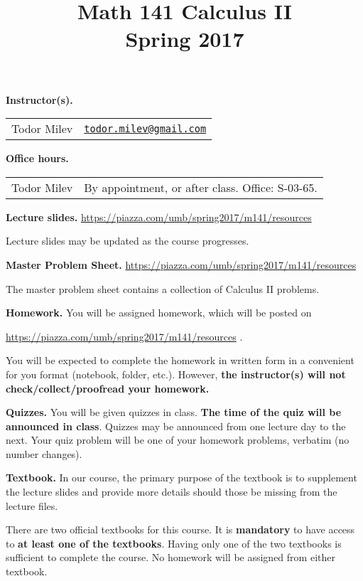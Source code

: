 \documentclass{article}
\title{Math 141 Calculus II \\ Spring 2017}
\date{}
\newcommand{\websitebase}{https://piazza.com/umb/spring2017/m141}
\begin{document}
\maketitle

\noindent \textbf{Instructor(s).} 
\begin{tabular}{ll}
Todor Milev & \href{mailto:todor.milev@gmail.com}{\nolinkurl{todor.milev@gmail.com}} 
\end{tabular}

\medskip
\noindent \textbf{Office hours. } \begin{tabular}{lp{12cm}}
Todor Milev & By appointment, or after class. Office: S-03-65.\\
\end{tabular}





\medskip \noindent \textbf{Lecture slides. }  \url{\websitebase/resources}

\medskip\noindent Lecture slides may be updated as the course progresses.


\medskip \noindent \textbf{Master Problem Sheet. }  \url{\websitebase/resources} 

\medskip\noindent The master problem sheet contains a collection of Calculus II problems. 

\medskip
\noindent \textbf{Homework.} You will be assigned homework, which will be posted on

\url{\websitebase/resources} \quad \quad \quad .

\noindent You will be expected to complete the homework in written form in a convenient for you format (notebook, folder, etc.). However, \textbf{the instructor(s) will not check/collect/proofread your homework.} 
 
\medskip
\noindent \textbf{Quizzes.} You will be given quizzes in class. \textbf{The time of the quiz will be announced in class}. Quizzes may be announced from one lecture day to the next. Your quiz problem will be one of your homework problems, verbatim (no number changes).

\medskip\noindent \textbf{Textbook. } In our course, the primary purpose of the textbook is to supplement the lecture slides and provide more details should those be missing from the lecture files.

There are two official textbooks for this course. It is  \textbf{mandatory} to have access to \textbf{at least one of the textbooks}. Having only one of the two textbooks is sufficient to complete the course. No homework will be assigned from either textbook. 
\end{document}
